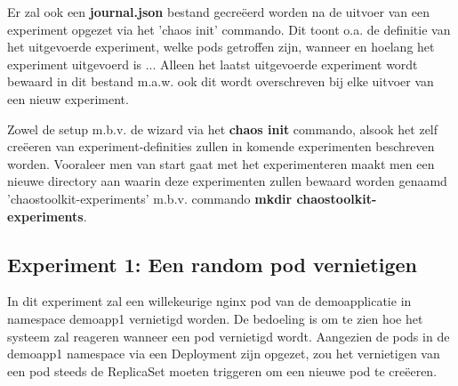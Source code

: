 Er zal ook een {\bf journal.json} bestand gecreëerd worden na de uitvoer van een experiment opgezet via het 'chaos init' commando. Dit toont o.a. de definitie van het uitgevoerde experiment, welke pods getroffen zijn, wanneer en hoelang het experiment uitgevoerd is ...
Alleen het laatst uitgevoerde experiment wordt bewaard in dit bestand m.a.w. ook dit wordt overschreven bij elke uitvoer van een nieuw experiment.   

Zowel de setup m.b.v. de wizard via het {\bf chaos init} commando, alsook het zelf creëeren van experiment-definities zullen in komende experimenten beschreven worden. Vooraleer men van start gaat met het experimenteren maakt men een nieuwe directory aan waarin deze experimenten zullen bewaard worden genaamd 'chaostoolkit-experiments' m.b.v. commando {\bf mkdir chaostoolkit-experiments}. 

\subsection{Experiment 1: Een random pod vernietigen}

In dit experiment zal een willekeurige nginx pod van de demoapplicatie in namespace demoapp1 vernietigd worden. De bedoeling is om te zien hoe het systeem zal reageren wanneer een pod vernietigd wordt. Aangezien de pods in de demoapp1 namespace via een Deployment zijn opgezet, zou het vernietigen van een pod steeds de ReplicaSet moeten triggeren om een nieuwe pod te creëeren.

